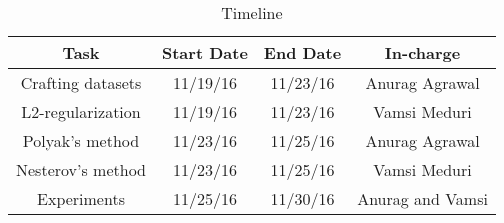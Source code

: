 \begin{table}[htb]
\caption{Timeline}
\centering
\begin{tabular}{c c c c}
	\hline\hline
	Task & Start Date & End Date & In-charge\\ [0.5ex] %
	\hline
Crafting datasets & 11/19/16 & 11/23/16 & Anurag Agrawal\\
L2-regularization & 11/19/16 & 11/23/16 & Vamsi Meduri\\
Polyak's method & 11/23/16 & 11/25/16 & Anurag Agrawal\\
Nesterov's method & 11/23/16 & 11/25/16 & Vamsi Meduri\\
Experiments & 11/25/16 & 11/30/16 & Anurag and Vamsi\\
\hline
\end{tabular}
\label{table:timeline}
\end{table}
